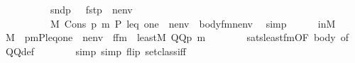 \begin{isabellebody}
\ \ \ \ \ \ \ \ \ \ {\isacharparenleft}{\kern0pt}snd{\isacharparenleft}{\kern0pt}{\isasymrho}p{\isacharparenright}{\kern0pt}\ {\isasymtturnstile}\ {\isasymphi}\ {\isacharparenleft}{\kern0pt}{\isacharbrackleft}{\kern0pt}fst{\isacharparenleft}{\kern0pt}{\isasymrho}p{\isacharparenright}{\kern0pt}{\isacharcomma}{\kern0pt}{\isasymtau}{\isacharbrackright}{\kern0pt}\ {\isacharat}{\kern0pt}\ nenv{\isacharparenright}{\kern0pt}{\isacharparenright}{\kern0pt}{\isacharparenright}{\kern0pt}\ {\isasymlongleftrightarrow}\isanewline
\ \ \ \ \ \ \ \ \ \ M{\isacharcomma}{\kern0pt}\ Cons{\isacharparenleft}{\kern0pt}{\isasymalpha}{\isacharcomma}{\kern0pt}\ {\isacharbrackleft}{\kern0pt}{\isasymrho}p{\isacharcomma}{\kern0pt}\ m{\isacharcomma}{\kern0pt}\ P{\isacharcomma}{\kern0pt}\ leq{\isacharcomma}{\kern0pt}\ one{\isacharbrackright}{\kern0pt}\ {\isacharat}{\kern0pt}\ nenv{\isacharparenright}{\kern0pt}\ {\isasymTurnstile}\ body{\isacharunderscore}{\kern0pt}fm{\isacharparenleft}{\kern0pt}{\isasymphi}{\isacharcomma}{\kern0pt}nenv{\isacharparenright}{\kern0pt}{\isachardoublequoteclose}\ \isamarkupfalse%
\ simp\isanewline
\ \ \ \ \isamarkupfalse%
\ inM\isanewline
\ \ \ \ \isamarkupfalse%
\ {\isachardoublequoteopen}M\ {\isacharcomma}{\kern0pt}\ {\isacharbrackleft}{\kern0pt}{\isasymrho}p{\isacharcomma}{\kern0pt}m{\isacharcomma}{\kern0pt}P{\isacharcomma}{\kern0pt}leq{\isacharcomma}{\kern0pt}one{\isacharbrackright}{\kern0pt}\ {\isacharat}{\kern0pt}\ nenv\ {\isasymTurnstile}\ {\isacharquery}{\kern0pt}f{\isacharunderscore}{\kern0pt}fm\ {\isasymlongleftrightarrow}\ least{\isacharparenleft}{\kern0pt}{\isacharhash}{\kern0pt}{\isacharhash}{\kern0pt}M{\isacharcomma}{\kern0pt}\ QQ{\isacharparenleft}{\kern0pt}{\isasymrho}p{\isacharparenright}{\kern0pt}{\isacharcomma}{\kern0pt}\ m{\isacharparenright}{\kern0pt}{\isachardoublequoteclose}\isanewline
\ \ \ \ \ \ \isamarkupfalse%
\ sats{\isacharunderscore}{\kern0pt}least{\isacharunderscore}{\kern0pt}fm{\isacharbrackleft}{\kern0pt}OF\ body{\isacharprime}{\kern0pt}{\isacharcomma}{\kern0pt}\ of\ {}{\isacharbrackright}{\kern0pt}\ \isamarkupfalse%
\ QQ{\isacharunderscore}{\kern0pt}def\isanewline
\ \ \ \ \ \ \isamarkupfalse%
\ {\isacharparenleft}{\kern0pt}simp{\isacharcomma}{\kern0pt}\ simp\ flip{\isacharcolon}{\kern0pt}\ setclass{\isacharunderscore}{\kern0pt}iff{\isacharparenright}{\kern0pt}\isanewline
\ \ \isacommand{{\isacharbraceright}{\kern0pt}}\isamarkupfalse%
\isanewline
\ \ \isamarkupfalse%
\isanewline
\ \ \isamarkupfalse%

\end{isabellebody}
